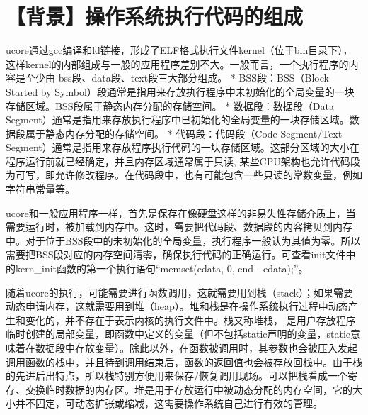 \section{【背景】操作系统执行代码的组成}\label{ux80ccux666fux64cdux4f5cux7cfbux7edfux6267ux884cux4ee3ux7801ux7684ux7ec4ux6210}

ucore通过gcc编译和ld链接，形成了ELF格式执行文件kernel（位于bin目录下），这样kernel的内部组成与一般的应用程序差别不大。一般而言，一个执行程序的内容是至少由
bss段、data段、text段三大部分组成。 * BSS段：BSS（Block Started by
Symbol）段通常是指用来存放执行程序中未初始化的全局变量的一块存储区域。BSS段属于静态内存分配的存储空间。
* 数据段：数据段（Data
Segment）通常是指用来存放执行程序中已初始化的全局变量的一块存储区域。数据段属于静态内存分配的存储空间。
* 代码段：代码段（Code Segment/Text
Segment）通常是指用来存放程序执行代码的一块存储区域。这部分区域的大小在程序运行前就已经确定，并且内存区域通常属于只读,
某些CPU架构也允许代码段为可写，即允许修改程序。在代码段中，也有可能包含一些只读的常数变量，例如字符串常量等。

ucore和一般应用程序一样，首先是保存在像硬盘这样的非易失性存储介质上，当需要运行时，被加载到内存中。这时，需要把代码段、数据段的内容拷贝到内存中。对于位于BSS段中的未初始化的全局变量，执行程序一般认为其值为零。所以需要把BSS段对应的内存空间清零，确保执行代码的正确运行。可查看init文件中的kern\_init函数的第一个执行语句``memset(edata,
0, end - edata);''。

随着ucore的执行，可能需要进行函数调用，这就需要用到栈（stack）；如果需要动态申请内存，这就需要用到堆（heap）。堆和栈是在操作系统执行过程中动态产生和变化的，并不存在于表示内核的执行文件中。栈又称堆栈，
是用户存放程序临时创建的局部变量，即函数中定义的变量（但不包括static声明的变量，static意味着在数据段中存放变量）。除此以外，在函数被调用时，其参数也会被压入发起调用函数的栈中，并且待到调用结束后，函数的返回值也会被存放回栈中。由于栈的先进后出特点，所以栈特别方便用来保存/恢复调用现场。可以把栈看成一个寄存、交换临时数据的内存区。堆是用于存放运行中被动态分配的内存空间，它的大小并不固定，可动态扩张或缩减，这需要操作系统自己进行有效的管理。
